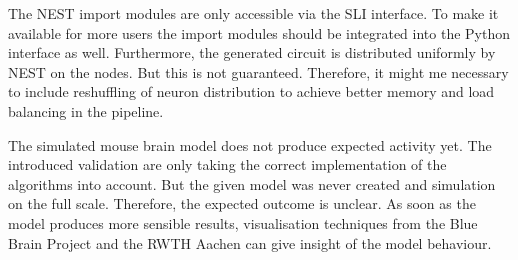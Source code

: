 The NEST import modules are only accessible via the SLI interface\cite{SLI}.
To make it available for more users the import modules should be integrated into the Python
interface as well. Furthermore, the generated circuit is distributed uniformly by NEST on the nodes. But this is not guaranteed. Therefore, it might me necessary to include reshuffling of neuron distribution to achieve better memory and load balancing in the pipeline.

The simulated mouse brain model does not produce expected activity yet.
The introduced validation are only taking the correct implementation of the algorithms into account.
But the given model was never created and simulation on the full scale. Therefore, the expected outcome is unclear. As soon as the model produces more sensible results, visualisation techniques from the
Blue Brain Project and the RWTH Aachen can give insight of the model behaviour.
